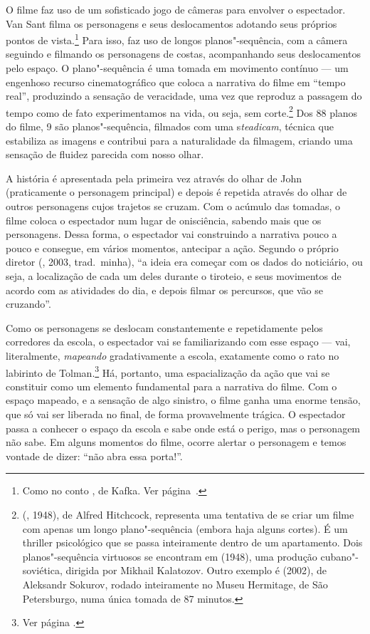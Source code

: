 O filme faz uso de um sofisticado jogo de câmeras para envolver o
espectador. Van Sant filma os personagens e seus deslocamentos adotando
seus próprios pontos de vista.\footnote{Como no conto {}, de Kafka. Ver página~\pageref{construcao}.} Para isso, faz uso
de longos planos"-sequência, com a câmera seguindo e filmando os
personagens de costas, acompanhando seus deslocamentos pelo espaço. O
plano"-sequência é uma tomada em movimento contínuo --- um engenhoso
recurso cinematográfico que coloca a narrativa do filme em ``tempo
real'', produzindo a sensação de veracidade, uma vez que reproduz a
passagem do tempo como de fato experimentamos na vida, ou seja, sem
corte.\footnote{{} ({}, 1948), de Alfred
  Hitchcock, representa uma tentativa de se criar um filme com apenas um
  longo plano"-sequência (embora haja alguns cortes). É um
  thriller psicológico que se passa inteiramente dentro de um
  apartamento. Dois planos"-sequência virtuosos se encontram em {} (1948), uma produção cubano"-soviética, dirigida por Mikhail
  Kalatozov. Outro exemplo é {} (2002), de Aleksandr
  Sokurov, rodado inteiramente no Museu Hermitage, de São Petersburgo,
  numa única tomada de 87 minutos.} Dos 88 planos do filme, 9 são
planos"-sequência, filmados com uma s\emph{teadicam}, técnica que
estabiliza as imagens e contribui para a naturalidade da filmagem,
criando uma sensação de fluidez parecida com nosso olhar.

A história é apresentada pela primeira vez através do olhar de John
(praticamente o personagem principal) e depois é repetida através do
olhar de outros personagens cujos trajetos se cruzam. Com o acúmulo das
tomadas, o filme coloca o espectador num lugar de onisciência, sabendo
mais que os personagens. Dessa forma, o espectador vai construindo a
narrativa pouco a pouco e consegue, em vários momentos, antecipar a
ação. Segundo o próprio diretor (, 2003, trad.~minha), ``a ideia
era começar com os dados do noticiário, ou seja, a localização de cada
um deles durante o tiroteio, e seus movimentos de acordo com as
atividades do dia, e depois filmar os percursos, que vão se cruzando''.

Como os personagens se deslocam constantemente e repetidamente pelos
corredores da escola, o espectador vai se familiarizando com esse espaço
--- vai, literalmente, \emph{mapeando} gradativamente a escola,
exatamente como o rato no labirinto de Tolman.\footnote{Ver página \pageref{tolman}.} Há, portanto, uma
espacialização da ação que vai se constituir como um elemento
fundamental para a narrativa do filme. Com o espaço mapeado, e a
sensação de algo sinistro, o filme ganha uma enorme tensão, que só vai
ser liberada no final, de forma provavelmente trágica. O espectador
passa a conhecer o espaço da escola e sabe onde está o perigo, mas o
personagem não sabe. Em alguns momentos do filme, ocorre alertar o
personagem e temos vontade de dizer: ``não abra essa porta!''.


